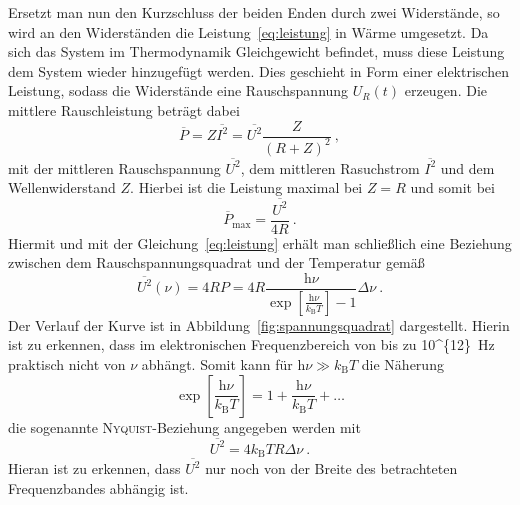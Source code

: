 Ersetzt man nun den Kurzschluss der beiden Enden durch zwei Widerstände,
so wird an den Widerständen die Leistung~\eqref{eq:leistung} in Wärme
umgesetzt.
Da sich das System im Thermodynamik Gleichgewicht befindet, muss diese Leistung
dem System wieder hinzugefügt werden.
Dies geschieht in Form einer elektrischen Leistung, sodass die Widerstände
eine Rauschspannung $U_R(t)$ erzeugen.
Die mittlere Rauschleistung beträgt dabei
\begin{equation}
  \overline{P} = Z \overline{I^2} = \overline{U^2} \frac{Z}{{(R+Z)}^2}~,
\end{equation}
mit der mittleren Rauschspannung $\overline{U^2}$, dem mittleren Rasuchstrom
$\overline{I^2}$ und dem Wellenwiderstand $Z$.
Hierbei ist die Leistung maximal bei $Z=R$ und somit bei
\begin{equation}
  \overline{P}_\text{max} = \frac{\overline{U^2}}{4R}~.
\end{equation}
Hiermit und mit der Gleichung~\eqref{eq:leistung} erhält man schließlich eine
Beziehung zwischen dem Rauschspannungsquadrat und der Temperatur gemäß
\begin{equation}
  \overline{U^2}(\nu) = 4RP = 4R
  \frac{\text{h}\nu}{\exp[\frac{\text{h}\nu}{k_\text{B}T}] - 1} \Delta \nu~.
\end{equation}
Der Verlauf der Kurve ist in Abbildung~\ref{fig:spannungsquadrat} dargestellt.
Hierin ist zu erkennen, dass im elektronischen Frequenzbereich von bis zu
\SI{10^{12}}{\hertz} praktisch nicht
von $\nu$ abhängt. Somit kann für $\text{h}\nu \gg k_\text{B}T$ die Näherung
\begin{equation}
  \exp[\frac{\text{h}\nu}{k_\text{B}T}] = 1 + \frac{\text{h} \nu}{k_\text{B}T}
  + \ldots
\end{equation}
die sogenannte \textsc{Nyquist}-Beziehung angegeben werden mit
\begin{equation}
  \overline{U^2} = 4 k_\text{B} T R \Delta \nu~.
  \label{eq:nyquist}
\end{equation}
Hieran ist zu erkennen, dass $\overline{U^2}$ nur noch von der Breite des
betrachteten Frequenzbandes abhängig ist.

